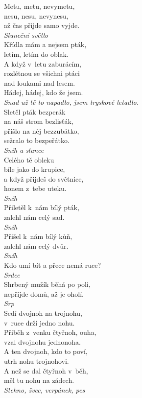 \begin{multicols}{4}
\noindent
Metu, metu, nevymetu,\\
nesu, nesu, nevynesu,\\
až čas přijde samo vyjde.\\[1 mm]
{\sl Sluneční světlo}\\

\noindent
Křídla mám a nejsem pták,\\
letím, letím do oblak.\\
A když v~letu zaburácím,\\
rozlétnou se všichni ptáci\\
nad loukami nad lesem.\\
Hádej, hádej, kdo že jsem.\\[1 mm]
{\sl Snad už tě to napadlo, jsem tryskové letadlo.}\\

\noindent
Sletěl pták bezperák\\
na náš strom bezlisťák,\\
přišlo na něj bezzubátko,\\
sežralo to bezpeřátko.\\[1 mm]
{\sl Sníh a slunce}\\

\noindent
Celého tě obleku\\
bíle jako do krupice,\\
a když přijdeš do světnice,\\
honem z~tebe uteku.\\[1 mm]
{\sl Sníh}\\

\noindent
Přiletěl k~nám bílý pták,\\
zalehl nám celý sad.\\[1 mm]
{\sl Sníh}\\

\noindent
Přišel k~nám bílý kůň,\\
zalehl nám celý dvůr.\\[1 mm]
{\sl Sníh}\\

\noindent
Kdo umí bít a přece nemá ruce?\\[1 mm]
{\sl Srdce}\\

\noindent
Shrbený mužík běhá po poli,\\
nepřijde domů, až je oholí.\\[1 mm]
{\sl Srp}\\

\noindent
Sedí dvojnoh na trojnohu,\\
v~ruce drží jedno nohu.\\
Přiběh z~venku čtyřnoh, ouha,\\
vzal dvojnohu jednonoha.\\
A ten dvojnoh, kdo to poví,\\
utrh nohu trojnohovi.\\
A než se dal čtyřnoh v~běh,\\
měl tu nohu na zádech.\\[1 mm]
{\sl Stehno, švec, verpánek, pes}\\


\end{multicols}
